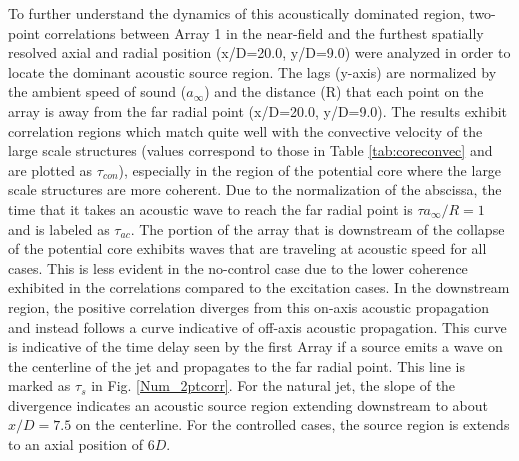 \documentclass[english]{aiaa-tc}
\begin{document}
To further understand the dynamics of this acoustically dominated region, two-point correlations between Array 1 in the near-field and the furthest spatially resolved axial and radial position (x/D=20.0, y/D=9.0) were analyzed in order to locate the dominant acoustic source region.
The lags (y-axis) are normalized by the ambient speed of sound ($a_{\infty}$) and the distance (R) that each point on the array is away from the far radial point (x/D=20.0, y/D=9.0).
The results exhibit correlation regions which match quite well with the convective velocity of the large scale structures (values correspond to those in Table \ref{tab:coreconvec} and are plotted as $\tau_{con}$), especially in the region of the potential core where the large scale structures are more coherent.
Due to the normalization of the abscissa, the time that it takes an acoustic wave to reach the far radial point is $\tau a_{\infty}/R=1$ and is labeled as $\tau_{ac}$. The portion of the array that is downstream of the collapse of the potential core exhibits waves that are traveling at acoustic speed for all cases. This is less evident in the no-control case due to the lower coherence exhibited in the correlations compared to the excitation cases.
In the downstream region, the positive correlation diverges from this on-axis acoustic propagation and instead follows a curve indicative of off-axis acoustic propagation. This curve is indicative of the time delay seen by the first Array if a source emits a wave on the centerline of the jet and propagates to the far radial point. This line is marked as $\tau_{s}$ in Fig. \ref{Num_2ptcorr}.
For the natural jet, the slope of the divergence indicates an acoustic source region extending downstream to about $x/D=7.5$ on the centerline. For the controlled cases, the source region is extends to an axial position of $6D$.
\end{document}
